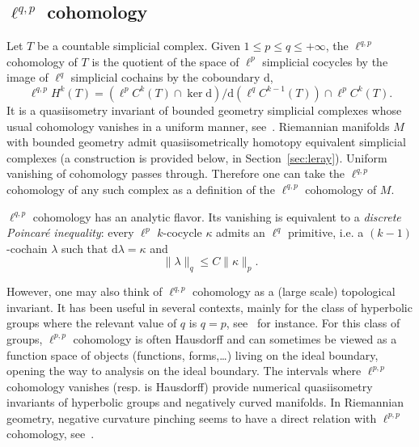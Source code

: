 \documentclass[11pt]{article}
\theoremstyle{definition}
\numberwithin{equation}{section}
\numberwithin{figure}{section}
\numberwithin{table}{section}
\newcommand{\dd}{\mathrm{d}}
\begin{document}
\subsection{\texorpdfstring{$\ell^{q,p}$}{ell(q,p)} cohomology}

Let $T$ be a countable simplicial complex. Given $1\leq p\leq q\leq +\infty$, the $\ell^{q,p}$ cohomology of $T$ is the quotient of the space of $\ell^p$ simplicial cocycles by the image of $\ell^q$ simplicial cochains by the coboundary $\dd$,
\[
\ell^{q,p}H^k(T)=(\ell^p C^k(T)\cap \ker \dd)/\dd(\ell^q C^{k-1}(T)) \cap \ell^p C^k(T).
\]
It is a quasiisometry invariant of bounded geometry simplicial complexes whose usual cohomology vanishes in a uniform manner, see~\cite{Bourdon-Pajot,Elek,Genton,Gromov,Pansu2}. Riemannian manifolds $M$ with bounded geometry admit quasiisometrically homotopy equivalent simplicial complexes (a construction is provided below, in Section~\ref{sec:leray}). Uniform vanishing of cohomology passes through. Therefore one can take the $\ell^{q,p}$ cohomology of any such complex as a definition of the $\ell^{q,p}$ cohomology of $M$.

$\ell^{q,p}$ cohomology has an analytic flavor. Its vanishing is equivalent to a \emph{discrete Poincar\'e inequality}: every $\ell^p$ $k$-cocycle $\kappa$ admits an $\ell^q$ primitive, i.e. a $(k-1)$-cochain $\lambda$ such that $\dd\lambda=\kappa$ and
\begin{equation}\label{eq:1}
\|\lambda\|_q \leq C \|\kappa\|_p.
\end{equation}

However, one may also think of $\ell^{q,p}$ cohomology as a (large scale) topological invariant. It has been useful in several contexts, mainly for the class of hyperbolic groups where the relevant value of $q$ is $q=p$, see~\cite{Bourdon-Kleiner,Bourdon-Pajot, Cornulier-Tessera,Drutu-Mackay} for instance. For this class of groups, $\ell^{p,p}$ cohomology is often Hausdorff and can sometimes be viewed as a function space of objects (functions, forms,\dots) living on the ideal boundary, opening the way to analysis on the ideal boundary. The intervals where $\ell^{p,p}$ cohomology vanishes (resp. is Hausdorff) provide numerical quasiisometry invariants of hyperbolic groups and negatively curved manifolds. In Riemannian geometry, negative curvature pinching seems to have a direct relation with $\ell^{p,p}$ cohomology, see~\cite{Pansu4}.
\end{document}
